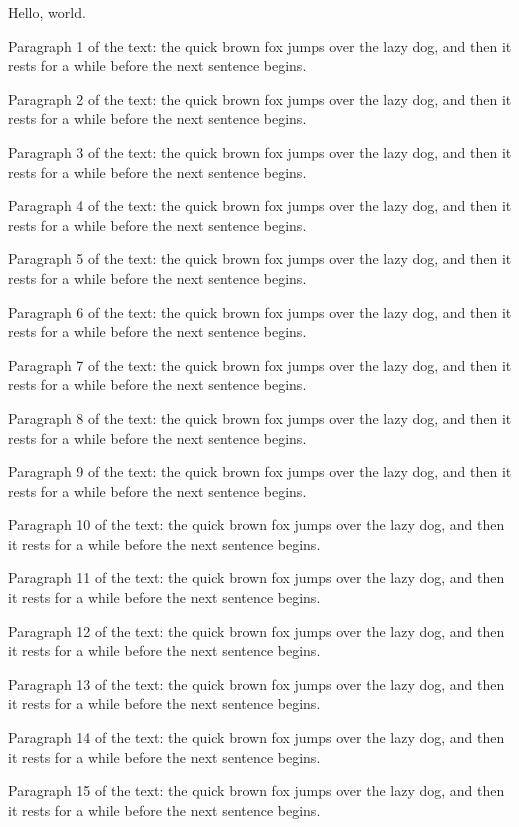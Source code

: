 \documentclass{article}
\begin{document}
Hello, world.

Paragraph 1 of the text: the quick brown fox jumps over the lazy dog, and then it rests for a while before the next sentence begins.

Paragraph 2 of the text: the quick brown fox jumps over the lazy dog, and then it rests for a while before the next sentence begins.

Paragraph 3 of the text: the quick brown fox jumps over the lazy dog, and then it rests for a while before the next sentence begins.

Paragraph 4 of the text: the quick brown fox jumps over the lazy dog, and then it rests for a while before the next sentence begins.

Paragraph 5 of the text: the quick brown fox jumps over the lazy dog, and then it rests for a while before the next sentence begins.

Paragraph 6 of the text: the quick brown fox jumps over the lazy dog, and then it rests for a while before the next sentence begins.

Paragraph 7 of the text: the quick brown fox jumps over the lazy dog, and then it rests for a while before the next sentence begins.

Paragraph 8 of the text: the quick brown fox jumps over the lazy dog, and then it rests for a while before the next sentence begins.

Paragraph 9 of the text: the quick brown fox jumps over the lazy dog, and then it rests for a while before the next sentence begins.

Paragraph 10 of the text: the quick brown fox jumps over the lazy dog, and then it rests for a while before the next sentence begins.

Paragraph 11 of the text: the quick brown fox jumps over the lazy dog, and then it rests for a while before the next sentence begins.

Paragraph 12 of the text: the quick brown fox jumps over the lazy dog, and then it rests for a while before the next sentence begins.

Paragraph 13 of the text: the quick brown fox jumps over the lazy dog, and then it rests for a while before the next sentence begins.

Paragraph 14 of the text: the quick brown fox jumps over the lazy dog, and then it rests for a while before the next sentence begins.

Paragraph 15 of the text: the quick brown fox jumps over the lazy dog, and then it rests for a while before the next sentence begins.
\end{document}
